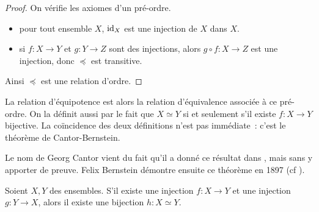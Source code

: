 \begin{proof}
  On vérifie les axiomes d'un pré-ordre.
  \begin{itemize}
  \item pour tout ensemble $X$, $\operatorname{id}_X$ est une injection de $X$ dans $X$.
  \item si $f : X \to Y$ et $g : Y \to Z$ sont des injections, alors
    $g\circ f : X \to Z$ est une injection, donc $\preceq$ est transitive.
  \end{itemize}
  Ainsi $\preceq$ est une relation d'ordre.
\end{proof}

La relation d'équipotence est alors la relation d'équivalence associée à ce
pré-ordre. On la définit aussi par le fait que $X\simeq Y$ si et seulement s'il
existe $f : X \to Y$ bijective. La coïncidence des deux définitions n'est pas
immédiate~: c'est le théorème de Cantor-Bernstein.

Le nom de Georg Cantor vient du fait qu'il a donné ce résultat dans 
\cite{Cantor1887}, mais sans y apporter de preuve. Felix Bernstein démontre
ensuite ce théorème en 1897 (cf \cite{deiser2004einführung}).

\begin{theorem}
  Soient $X,Y$ des ensembles. S'il existe une injection $f : X \to Y$ et une
  injection $g : Y \to X$, alors il existe une bijection $h : X \simeq Y$.
\end{theorem}

